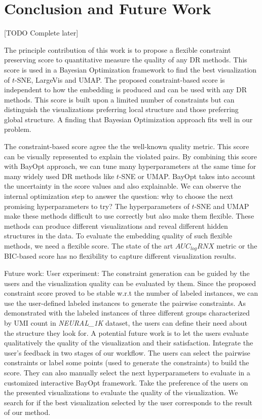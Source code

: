 \section{Conclusion and Future Work}\label{sec:conclusion}

[TODO Complete later]

The principle contribution of this work is to propose a flexible constraint preserving score to quantitative measure the quality of any DR methods.
This score is used in a Bayesian Optimization framework to find the best visualization of $t$-SNE, LargeVis and UMAP.
The proposed constraint-based score is independent to how the embedding is produced and can be used with any DR methods.
This score is built upon a limited number of constraints but can distinguish the visualizations preferring local structure and those preferring global structure.
A finding that Bayesian Optimization approach fits well in our problem.

The constraint-based score agree the the well-known quality metric.
This score can be visually represented to explain the violated pairs.
By combining this score with BayOpt approach, we can tune many hyperparameters at the same time for many widely used DR methods like $t$-SNE or UMAP.
BayOpt takes into account the uncertainty in the score values and also explainable. We can observe the internal optimization step to answer the question: why to choose the next promising hyperparameters to try?
The hyperparameters of $t$-SNE and UMAP make these methods difficult to use correctly but also make them flexible.
These methods can produce different visualizations and reveal different hidden structures in the data.
To evaluate the embedding quality of such flexible methods, we need a flexible score.
The state of the art $AUC_{log}RNX$ metric or the BIC-based score has no flexibility to capture different visualization results.

Future work: User experiment:
The constraint generation can be guided by the users and the visualization quality can be evaluated by them.
Since the proposed constraint score proved to be stable w.r.t the number of labeled instances,
we can use the user-defined labeled instances to generate the pairwise constraints.
As demonstrated with the labeled instances of three different groups characterized by UMI count in \emph{NEURAL\_1K} dataset, the users can define their need about the structure they look for.
A potential future work is to let the users evaluate qualitatively the quality of the visualization and their satisfaction.
Integrate the user's feedback in two stages of our workflow.
The users can select the pairwise constraints or label some points (used to generate the constraints) to build the score.
They can also manually select the next hyperparameters to evaluate in a customized interactive BayOpt framework.
Take the preference of the users on the presented visualizations to evaluate the quality of the visualization. We search for if the best visualization selected by the user corresponds to the result of our method.
